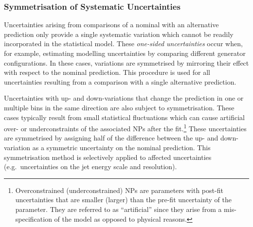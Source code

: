 

\subsubsection{Symmetrisation of Systematic Uncertainties}

Uncertainties arising from comparisons of a nominal with an alternative
prediction only provide a single systematic variation which cannot be readily
incorporated in the statistical model. These \emph{one-sided uncertainties}
occur when, for example, estimating modelling uncertainties by comparing
different generator configurations. In these cases, variations are symmetrised
by mirroring their effect with respect to the nominal prediction. This procedure
is used for all uncertainties resulting from a comparison with a single
alternative prediction.

Uncertainties with up- and down-variations that change the prediction in one or
multiple bins in the same direction are also subject to symmetrisation. These
cases typically result from small statistical fluctuations which can cause
artificial over- or underconstraints of the associated NPs after the
fit.\footnote{Overconstrained (underconstrained) NPs are parameters with
  post-fit uncertainties that are smaller (larger) than the pre-fit uncertainty
  of the parameter. They are referred to as ``artificial'' since they arise from
  a mis-specification of the model as opposed to physical reasons.} These
uncertainties are symmetrised by assigning half of the difference between the
up- and down-variation as a symmetric uncertainty on the nominal
prediction. This symmetrisation method is selectively applied to affected
uncertainties (e.g.\ uncertainties on the jet energy scale and resolution).




